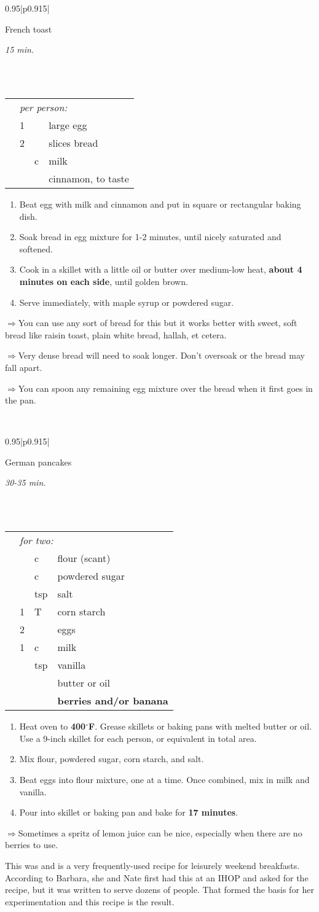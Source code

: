 \documentclass[8pt]{report}
\newcommand{\ingredmargin}{0.25cm}
\newcommand{\F}{$^\circ$F}
\newcommand{\fr}[2]{\nicefrac{#1}{#2}}
\newenvironment{recipe}[3]
  {\bigskip \bigskip 
\begin{tabular*}{0.95\textwidth}{|p{0.915\textwidth}|} \hline \vspace{0.25mm}
\begin{minipage}{0.7\textwidth}	\begin{flushleft} {\Large \textsf{#1}} \end{flushleft} \end{minipage}
\begin{minipage}{0.2\textwidth} \begin{flushright} \emph{#2} \end{flushright} \end{minipage} \\ \\ \hline
\begin{ingreds}{#3} \addcontentsline{toc}{section}{#1} \phantomsection \label{rec:#1}} 
  {\\ \hline \end{tabular*} \noindent}
\newenvironment{ingreds}[1]
  {\begin{tabular}{lrlp{0.6\textwidth}} \hspace{\ingredmargin} & \multicolumn{3}{l}{\it #1:} \\}
  {\end{tabular} \medskip}
\newcommand{\ingredsdone}{\end{ingreds}\begin{enumerate}}
\newcommand{\stepsdone}{\end{enumerate} \medskip}
\newcommand{\notefont}{\renewcommand*\rmdefault{pzc}\normalfont\upshape \large}
\newcommand{\ingredient}[3]{\hspace{\ingredmargin} & #1 & #2 & #3 \\}
\newcommand{\tip}{$\Rightarrow$}
\begin{document}
\begin{recipe}{French toast}{15 min.}{per person}
\index{breakfast!french toast} \index{french toast} 
\ingredient{1}{}{large egg}
\ingredient{2}{}{slices bread}
\ingredient{\fr12}{c}{milk}
\ingredient{}{}{cinnamon, to taste}
\ingredsdone 
\item Beat egg with milk and cinnamon and put in square or rectangular baking dish.
\item Soak bread in egg mixture for 1-2 minutes, until nicely saturated and softened.
\item Cook in a skillet with a little oil or butter over medium-low heat, {\bf about 4 minutes on each side}, until golden brown.
\item Serve immediately, with maple syrup or powdered sugar.
\stepsdone
\noindent \tip You can use any sort of bread for this but it works better with sweet, soft bread like raisin toast, plain white bread, hallah, et cetera.  \medskip

\noindent \tip Very dense bread will need to soak longer.  Don't oversoak or the bread may fall apart.  \medskip

\noindent \tip You can spoon any remaining egg mixture over the bread when it first goes in the pan.

\end{recipe}

\begin{recipe}{German pancakes}{30-35 min.}{for two}
\index{breakfast!german pancakes} \index{german pancakes}
\index{pancakes!german}
\ingredient{\fr13}{c}{flour (scant)}
\ingredient{\fr14}{c}{powdered sugar}
\ingredient{\fr13}{tsp}{salt}
\ingredient{1}{T}{corn starch}
\ingredient{2}{}{eggs}
\ingredient{1}{c}{milk}
\ingredient{\fr12}{tsp}{vanilla}
\ingredient{}{}{butter or oil}
\ingredient{}{}{\bf berries and/or banana}
\ingredsdone
\item Heat oven to {\bf 400\F}.  Grease skillets or baking pans with melted butter or oil.  Use a 9-inch skillet for each person, or equivalent in total area.  
\item Mix flour, powdered sugar, corn starch, and salt.  
\item Beat eggs into flour mixture, one at a time.  Once combined, mix in milk and vanilla.
\item Pour into skillet or baking pan and bake for {\bf 17 minutes}.
\stepsdone
\noindent \tip Sometimes a spritz of lemon juice can be nice, especially when there are no berries to use. \medskip

{\notefont This was and is a very frequently-used recipe for leisurely weekend breakfasts.
According to Barbara, she and Nate first had this at an IHOP and asked for the recipe, but it was written to serve
dozens of people.  That formed the basis for her experimentation and this recipe is the result.}
\end{recipe}
\end{document}
